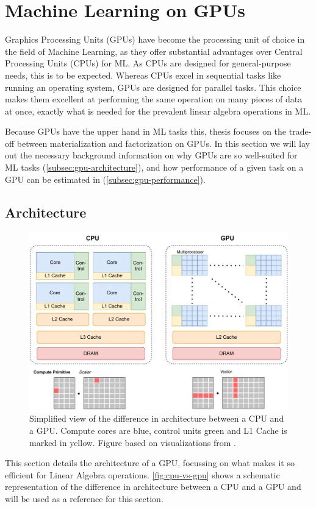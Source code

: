\section{Machine Learning on GPUs}
\label{sec:2-ml-on-gpu}
Graphics Processing Units (GPUs) have become the processing unit of choice in the field of Machine Learning, as they offer substantial advantages over Central Processing Units (CPUs) for ML. As CPUs are designed for general-purpose needs, this is to be expected. Whereas CPUs excel in sequential tasks like running an operating system, GPUs are designed for parallel tasks. This choice makes them excellent at performing the same operation on many pieces of data at once, exactly what is needed for the prevalent linear algebra operations in ML.

Because GPUs have the upper hand in ML tasks this, thesis focuses on the trade-off between materialization and factorization on GPUs. In this section we will lay out the necessary background information on why GPUs are so well-suited for ML tasks (\autoref{subsec:gpu-architecture}), and how performance of a given task on a GPU can be estimated in (\autoref{subsec:gpu-performance}).

\subsection{Architecture}
\label{subsec:gpu-architecture}

\begin{figure}[ht]
    \includegraphics[width=.95\linewidth]{chapters/02_preliminaries/figures/CPU-vs-GPU.pdf}
    \caption[Simplified view of the difference in architecture between a CPU and a GPU.]{ Simplified view of the difference in architecture between a CPU and a GPU. Compute cores are blue, control units green and L1 Cache is marked in yellow. Figure based on visualizations from \cite{gpu-in-ml-survey, cuda-programming-guide, tvm}.}
    \label{fig:cpu-vs-gpu}
\end{figure}
This section details the architecture of a GPU, focussing on what makes it so efficient for Linear Algebra operations. \autoref{fig:cpu-vs-gpu} shows a schematic representation of the difference in architecture between a CPU and a GPU and will be used as a reference for this section.

